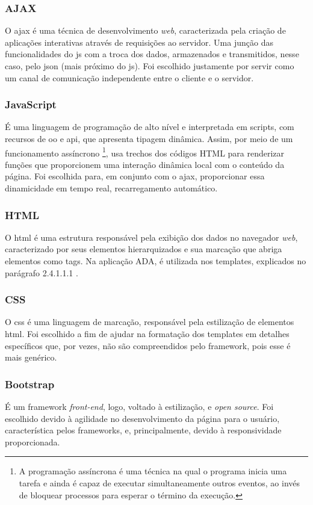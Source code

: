 \subsubsection{AJAX}
O \ac{ajax} é uma técnica de desenvolvimento \textit{web}, caracterizada pela criação de aplicações interativas através de requisições ao servidor. Uma junção das funcionalidades do \ac{js} com a troca dos dados, armazenados e transmitidos, nesse caso, pelo \ac{json} (mais próximo do \ac{js}). Foi escolhido justamente por servir como um canal de comunicação independente entre o cliente e o servidor.
\cite{andrei_2019} \cite{carvalho_2007}

\subsubsection{JavaScript}
É uma linguagem de programação de alto nível e interpretada em scripts, com recursos de \ac{oo} e \ac{api}, que apresenta tipagem dinâmica. Assim, por meio de um funcionamento assíncrono \footnote{A programação assíncrona é uma técnica na qual o programa inicia uma tarefa e ainda é capaz de executar simultaneamente outros eventos, ao invés de bloquear processos para esperar o término da execução.}, usa trechos dos códigos HTML para renderizar funções que proporcionem uma interação dinâmica local com o conteúdo da página. Foi escolhida para, em conjunto com o \ac{ajax}, proporcionar essa dinamicidade em tempo real, recarregamento automático.
\cite{mozilla_2023} \cite{melo_2021}

\subsubsection{HTML}
O \ac{html} é uma estrutura responsável pela exibição dos dados no navegador \textit{web}, caracterizado por seus elementos hierarquizados e sua marcação que abriga elementos como tags. Na aplicação ADA, é utilizada nos templates, explicados no parágrafo 2.4.1.1.1 .
\cite{mozilla_2023b}

\subsubsection{CSS}
O \ac{css} é uma linguagem de marcação, responsável pela estilização de elementos \ac{html}. Foi escolhido a fim de ajudar na formatação dos templates em detalhes específicos que, por vezes, não são compreendidos pelo framework, pois esse é mais genérico.
\cite{totvs_2020}

\subsubsection{Bootstrap}
É um \gls{framework} \textit{front-end}, logo, voltado à estilização, e \textit{\gls{open source}}. Foi escolhido devido à agilidade no desenvolvimento da página para o usuário, característica pelos frameworks, e, principalmente, devido à responsividade proporcionada.
\cite{andrei_2019} \cite{lima_2021}

